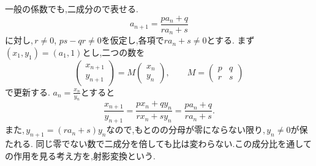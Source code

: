 一般の係数でも,二成分ので表せる.
\[
  a_{n+1}=\frac{pa_n+q}{ra_n+s}
\]
に対し,\,$r\ne0$, $ps-qr\ne0$を仮定し,各項で$ra_n+s\ne0$とする.
まず$(x_1,y_1)=(a_1,1)$とし,二つの数を
\[
  \begin{pmatrix}x_{n+1}\\y_{n+1}\end{pmatrix}
  =
  M\begin{pmatrix}x_n\\y_n\end{pmatrix},
  \qquad
  M=\begin{pmatrix}p&q\\r&s\end{pmatrix}
\]
で更新する.
$\displaystyle a_n=\frac{x_n}{y_n}$とすると
\[
  \frac{x_{n+1}}{y_{n+1}}
  =\frac{px_n+qy_n}{rx_n+sy_n}
  =\frac{pa_n+q}{ra_n+s}.
\]
また,\,$y_{n+1}=(ra_n+s)y_n$なので,もとのの分母が零にならない限り,\,$y_n\ne0$が保たれる.
同じ零でない数で二成分を倍しても比は変わらない.この成分比を通しての作用を見る考え方を,射影変換という.


